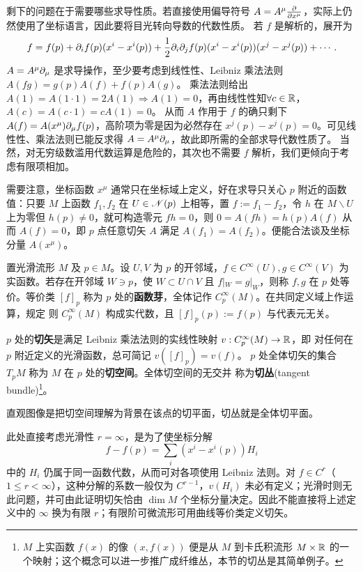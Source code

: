 剩下的问题在于需要哪些求导性质。若直接使用偏导符号 $A=A^\mu\pdv{x^\mu}$，实际上仍然使用了坐标语言，因此要将目光转向导数的代数性质。
若 $f$ 是解析的，展开为
\[
    f=f(p)+\partial_i f(p)(x^i-x^i(p))+ \frac 12\partial_i\partial_j f(p)(x^i-x^i(p))(x^j-x^j(p))+\cdots.
\]
$A=A^\mu\partial_\mu$ 是求导操作，至少要考虑到线性性、Leibniz 乘法法则 $A(fg)=g(p)A(f)+f(p)A(g)$。
乘法法则给出 $A(1)=A(1\cdot 1)=2A(1)\Rightarrow A(1)=0$，再由线性性知$\forall c\in\mathbb{R}$，$A(c)=A(c\cdot 1)=c A(1)=0$。
从而 $A$ 作用于 $f$ 的确只剩下 $A(f)=A(x^\mu)\partial_\mu f(p)$，高阶项为零是因为必然存在 $x^j(p)-x^j(p)=0$。可见线性性、乘法法则已能反求得 $A=A^\mu\partial_\mu$，故此即所需的全部求导代数性质了。
当然，对无穷级数滥用代数运算是危险的，其次也不需要 $f$ 解析，我们更倾向于考虑有限项相加。

需要注意，坐标函数 $x^\mu$ 通常只在坐标域上定义，好在求导只关心 $p$ 附近的函数值：只要 $M$ 上函数 $f_1,f_2$ 在 $U\in\mathscr N(p)$ 上相等，置 $f:=f_1-f_2$，令 $h$ 在 $M\backslash U$ 上为零但 $h(p)\ne 0$，就可构造零元 $fh=0$，则 $0=A(fh)=h(p)A(f)$ 从而 $A(f)=0$，即 $p$ 点任意切矢 $A$ 满足 $A(f_1)=A(f_2)$。便能合法谈及坐标分量 $A(x^\mu)$。

\begin{definition}
    置光滑流形 $M$ 及 $p\in M$。设 $U,V$ 为 $p$ 的开邻域，$f\in C^\infty(U),g\in C^\infty(V)$ 为实函数。若存在开邻域 $W\ni p$，使 $W\subset U\cap V$ 且 $f|_W=g|_W$，则称 $f,g$ 在 $p$ 处等价。等价类 $[f]_p$ 称为 $p$ 处的\textbf{函数芽}，全体记作 $C^\infty_p(M)$。在共同定义域上作运算，规定
    则 $C^\infty_p(M)$ 构成实代数，且 $[f]_p(p):=f(p)$ 与代表元无关。

    $p$ 处的\textbf{切矢}是满足 Leibniz 乘法法则的实线性映射 $v:C^\infty_p(M)\to\mathbb{R}$，即
    对任何在 $p$ 附近定义的光滑函数，总可简记 $v([f]_p)=v(f)$。
    $p$ 处全体切矢的集合 $T_p M$ 称为 $M$ 在 $p$ 处的\textbf{切空间}。全体切空间的无交并
    称为\textbf{切丛}(tangent bundle)\footnote{$M$ 上实函数 $f(x)$ 的像 $(x,f(x))$ 便是从 $M$ 到卡氏积流形 $M\times \mathbb{R}$ 的一个映射；这个概念可以进一步推广成纤维丛，本节的切丛是其简单例子。}。
\end{definition}

\begin{remark}
    直观图像是把切空间理解为背景在该点的切平面，切丛就是全体切平面。

    此处直接考虑光滑性 $r=\infty$，是为了使坐标分解
    \[
        f-f(p)=\sum_i(x^i-x^i(p))H_i
    \]
    中的 $H_i$ 仍属于同一函数代数，从而可对各项使用 Leibniz 法则。对 $f\in C^r$（$1\leqslant r<\infty$），这种分解的系数一般仅为 $C^{r-1}$，$v(H_i)$ 未必有定义；光滑时则无此问题，并可由此证明切矢恰由 $\dim M$ 个坐标分量决定。因此不能直接将上述定义中的 $\infty$ 换为有限 $r$；有限阶可微流形可用曲线等价类定义切矢。
\end{remark}

